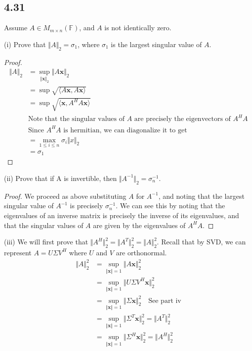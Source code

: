 \documentclass{article}
\newcommand{\inprod}[1]{\langle #1 \rangle}
\begin{document}
	\subsection*{4.31}
	Assume $A \in M_{m \times n}(\mathbb{F})$, and $A$ is not identically zero.
	
	(i) Prove that $\Vert A \Vert_2 = \sigma_1$, where $\sigma_1$ is the largest singular value of $A$. 
	\begin{proof}
		\begin{align*}
		\Vert A \Vert_2 &= \sup_{\Vert \mathbf{x} \Vert_2} \Vert A \mathbf{x} \Vert_2 \\
		&= \sup \sqrt{\inprod{A \mathbf{x}, A \mathbf{x}}} \\
		&= \sup \sqrt{\inprod{\mathbf{x}, A^H A \mathbf{x}}} \\
		&\text{Note that the singular values of $A$ are precisely the eigenvectors of $A^H A$}\\
		&\text{Since $A^HA$ is hermitian, we can diagonalize it to get} \\
		&=\max_{1 \leq i \leq n} \sigma_i \Vert x \Vert_2 \\
		&= \sigma_1
		\end{align*}
	\end{proof}
	
	(ii) Prove that if A is invertible, then $\Vert A^{-1} \Vert_2 = \sigma_n^{-1}$. 
	\begin{proof}
		We proceed as above substituting $A$ for $A^{-1}$, and noting that the largest singular value of $A^{-1}$ is precisely $\sigma_n^{-1}$. We can see this by noting that the eigenvalues of an inverse matrix is precisely the inverse of its eigenvalues, and that the singular values of $A$ are given by the eigenvalues of $A^H A$.
	\end{proof}
	
	(iii) We will first prove that $\Vert A^H \Vert_2^2 = \Vert A^T \Vert_2^2 = \Vert A \Vert_2^2$. Recall that by SVD, we can represent $A = U \Sigma V^H$ where $U$ and $V$ are orthonormal.
	\begin{align*}
	\Vert A \Vert_2^2 &= \sup_{\Vert \mathbf{x} \Vert = 1} \Vert A \mathbf{x} \Vert_2^2 \\
	&= \sup_{\Vert \mathbf{x} \Vert= 1} \Vert U \Sigma V^H  \mathbf{x} \Vert_2^2 \\
	&= \sup_{\Vert \mathbf{x} \Vert =1} \Vert \Sigma \mathbf{x} \Vert_2^2 \quad \text{See part iv} \\
	&= \sup_{\Vert \mathbf{x} \Vert = 1} \Vert \Sigma^T \mathbf{x} \Vert_2^2 = \Vert A^T \Vert_2^2 \\
	&= \sup_{\Vert \mathbf{x} \Vert =1} \Vert \Sigma^H \mathbf{x} \Vert_2^2 = \Vert A^H \Vert_2^2 
	\end{align*}
	
\end{document}
